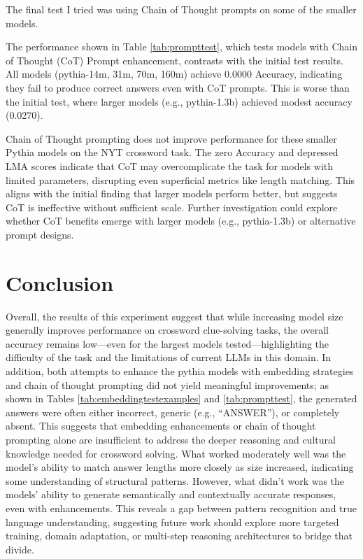 \documentclass[
	a4paper, %
	10pt, %
	unnumberedsections, %
	twoside, %
]{LTJournalArticle}
\begin{document}
The final test I tried was using Chain of Thought prompts on some of the smaller models.

The performance shown in Table \ref{tab:prompttest}, which tests models with Chain of Thought (CoT) Prompt enhancement, contrasts with the initial test results. All models (pythia-14m, 31m, 70m, 160m) achieve 0.0000 Accuracy, indicating they fail to produce correct answers even with CoT prompts. This is worse than the initial test, where larger models (e.g., pythia-1.3b) achieved modest accuracy (0.0270).

Chain of Thought prompting does not improve performance for these smaller Pythia models on the NYT crossword task. The zero Accuracy and depressed LMA scores indicate that CoT may overcomplicate the task for models with limited parameters, disrupting even superficial metrics like length matching. This aligns with the initial finding that larger models perform better, but suggests CoT is ineffective without sufficient scale. Further investigation could explore whether CoT benefits emerge with larger models (e.g., pythia-1.3b) or alternative prompt designs.



\section{Conclusion}

Overall, the results of this experiment suggest that while increasing model size generally improves performance on crossword clue-solving tasks, the overall accuracy remains low—even for the largest models tested—highlighting the difficulty of the task and the limitations of current LLMs in this domain. In addition, both attempts to enhance the pythia models with embedding strategies and chain of thought prompting did not yield meaningful improvements; as shown in Tables \ref{tab:embeddingtestexamples} and \ref{tab:prompttest}, the generated answers were often either incorrect, generic (e.g., “ANSWER”), or completely absent. This suggests that embedding enhancements or chain of thought prompting alone are insufficient to address the deeper reasoning and cultural knowledge needed for crossword solving. What worked moderately well was the model's ability to match answer lengths more closely as size increased, indicating some understanding of structural patterns. However, what didn’t work was the models' ability to generate semantically and contextually accurate responses, even with enhancements. This reveals a gap between pattern recognition and true language understanding, suggesting future work should explore more targeted training, domain adaptation, or multi-step reasoning architectures to bridge that divide.
\end{document}
